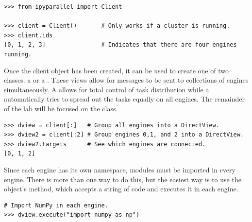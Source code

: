 \begin{lstlisting}
>>> from ipyparallel import Client

>>> client = Client()       # Only works if a cluster is running.
>>> client.ids
[0, 1, 2, 3]                # Indicates that there are four engines running.
\end{lstlisting}

Once the client object has been created, it can be used to create one of two classes: a  or a .
These views allow for messages to be sent to collections of engines simultaneously.
A  allows for total control of task distribution while a  automatically tries to spread out the tasks equally on all engines.
The remainder of the lab will be focused on the  class.

\begin{lstlisting}
>>> dview = client[:]   # Group all engines into a DirectView.
>>> dview2 = client[:2] # Group engines 0,1, and 2 into a DirectView.
>>> dview2.targets      # See which engines are connected.
[0, 1, 2]
\end{lstlisting}

Since each engine has its own namespace, modules must be imported in every engine.
There is more than one way to do this, but the easiest way is to use the  object's  method, which accepts a string of code and executes it in each engine.


\begin{lstlisting}
# Import NumPy in each engine.
>>> dview.execute("import numpy as np")
\end{lstlisting}


